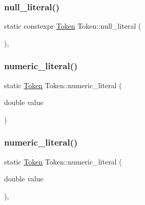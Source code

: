 \subsubsection{\texorpdfstring{null\+\_\+literal()}{null\_literal()}\hspace{0.1cm}{\footnotesize\ttfamily [2/2]}}
{\footnotesize\ttfamily static constexpr \hyperlink{class_token}{Token} Token\+::null\+\_\+literal (\begin{DoxyParamCaption}{ }\end{DoxyParamCaption})\hspace{0.3cm}{\ttfamily [inline]}, {\ttfamily [static]}}

\mbox{\label{class_token_a6b30fa87c5bbd0c0b7b0e7b4344eeb8b}} 
\subsubsection{\texorpdfstring{numeric\+\_\+literal()}{numeric\_literal()}\hspace{0.1cm}{\footnotesize\ttfamily [1/2]}}
{\footnotesize\ttfamily static \hyperlink{class_token}{Token} Token\+::numeric\+\_\+literal (\begin{DoxyParamCaption}\item[{double}]{value }\end{DoxyParamCaption})\hspace{0.3cm}{\ttfamily [static]}}

\mbox{\label{class_token_a6b30fa87c5bbd0c0b7b0e7b4344eeb8b}} 
\subsubsection{\texorpdfstring{numeric\+\_\+literal()}{numeric\_literal()}\hspace{0.1cm}{\footnotesize\ttfamily [2/2]}}
{\footnotesize\ttfamily static \hyperlink{class_token}{Token} Token\+::numeric\+\_\+literal (\begin{DoxyParamCaption}\item[{double}]{value }\end{DoxyParamCaption})\hspace{0.3cm}{\ttfamily [inline]}, {\ttfamily [static]}}

